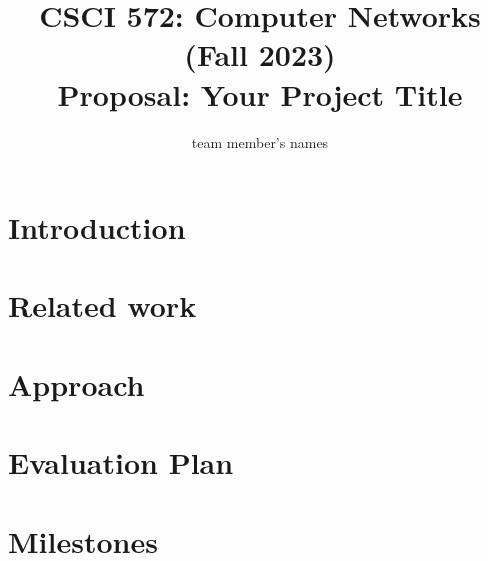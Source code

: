 \documentclass[10pt]{article}
\title{{\normalsize CSCI 572: Computer Networks (Fall 2023)}\\Proposal: Your Project Title}
\author{team member's names}
\date{}
\begin{document}
\maketitle

\section{Introduction}
\section{Related work}
  
\section{Approach} %
\section{Evaluation Plan}
    
\section{Milestones} %



\end{document}
